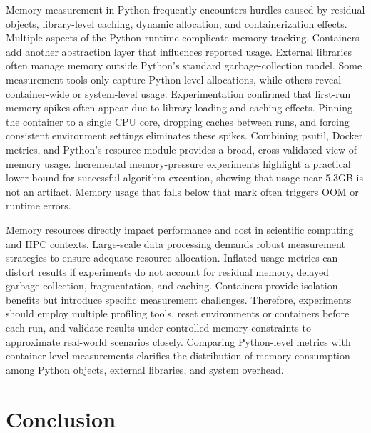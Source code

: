 Memory measurement in Python frequently encounters hurdles caused by residual objects, library-level caching, dynamic allocation, and containerization effects.
Multiple aspects of the Python runtime complicate memory tracking.
Containers add another abstraction layer that influences reported usage.
External libraries often manage memory outside Python's standard garbage-collection model.
Some measurement tools only capture Python-level allocations, while others reveal container-wide or system-level usage.
Experimentation confirmed that first-run memory spikes often appear due to library loading and caching effects.
Pinning the container to a single \ac{CPU} core, dropping caches between runs, and forcing consistent environment settings eliminates these spikes.
Combining psutil, Docker metrics, and Python's resource module provides a broad, cross-validated view of memory usage.
Incremental memory-pressure experiments highlight a practical lower bound for successful algorithm execution, showing that usage near 5.3\ac{GB} is not an artifact.
Memory usage that falls below that mark often triggers \ac{OOM} or runtime errors.

Memory resources directly impact performance and cost in scientific computing and \ac{HPC} contexts.
Large-scale data processing demands robust measurement strategies to ensure adequate resource allocation.
Inflated usage metrics can distort results if experiments do not account for residual memory, delayed garbage collection, fragmentation, and caching.
Containers provide isolation benefits but introduce specific measurement challenges.
Therefore, experiments should employ multiple profiling tools, reset environments or containers before each run, and validate results under controlled memory constraints to approximate real-world scenarios closely.
Comparing Python-level metrics with container-level measurements clarifies the distribution of memory consumption among Python objects, external libraries, and system overhead.


\section{Conclusion}
\label{sec:appendix-conclusion}

